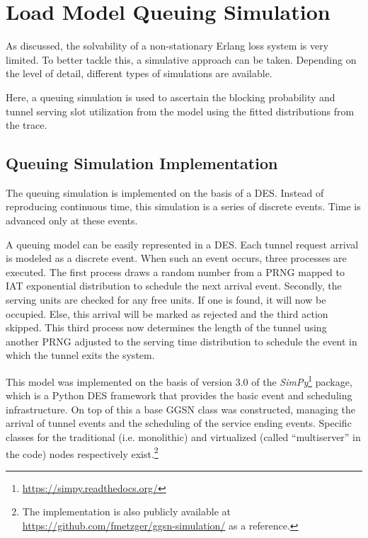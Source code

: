 \section{Load Model Queuing Simulation} 
\label{c4:sec:simulation}

As discussed, the solvability of a non-stationary Erlang loss system is very limited. To better tackle this, a simulative approach can be taken. Depending on the level of detail, different types of simulations are available.

Here, a queuing simulation is used to ascertain the blocking probability and tunnel serving slot utilization from the model using the fitted distributions from the trace.


\subsection{Queuing Simulation Implementation}

The queuing simulation is implemented on the basis of a \gls{DES}. Instead of reproducing continuous time, this simulation is a series of discrete events. Time is advanced only at these events. 

A queuing model can be easily represented in a \gls{DES}.  Each tunnel request arrival is modeled as a discrete event. When such an event occurs, three processes are executed. The first process draws a random number from a \gls{PRNG} mapped to \gls{IAT} exponential distribution to schedule the next arrival event. Secondly, the serving units are checked for any free units. If one is found, it will now be occupied. Else, this arrival will be marked as rejected and the third action skipped. This third process now determines the length of the tunnel using another \gls{PRNG} adjusted to the serving time distribution to schedule the event in which the tunnel exits the system.

This model was implemented on the basis of version 3.0 of the \textit{SimPy}\footnote{\url{https://simpy.readthedocs.org/}} package, which is a Python \gls{DES} framework that provides the basic event and scheduling infrastructure. On top of this a base \gls{GGSN} class was constructed, managing the arrival of tunnel events and the scheduling of the service ending events. Specific classes for the traditional (i.e. monolithic) and virtualized (called ``multiserver'' in the code) nodes respectively exist.\footnote{The implementation is also publicly available at \url{https://github.com/fmetzger/ggsn-simulation/} as a reference.}



